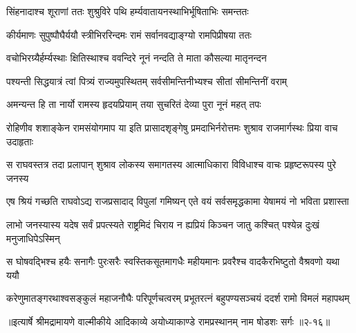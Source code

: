 \twolineshloka
{सिंहनादाश्च शूराणां ततः शुश्रुविरे पथि}
{हर्म्यवातायनस्थाभिर्भूषिताभिः समन्ततः} %

\twolineshloka
{कीर्यमाणः सुपुष्पौघैर्ययौ स्त्रीभिररिन्दमः}
{रामं सर्वानवद्याङ्ग्यो रामपिप्रीषया ततः} %

\twolineshloka
{वचोभिरग्र्यैर्हर्म्यस्थाः क्षितिस्थाश्च ववन्दिरे}
{नूनं नन्दति ते माता कौसल्या मातृनन्दन} %

\twolineshloka
{पश्यन्ती सिद्धयात्रं त्वां पित्र्यं राज्यमुपस्थितम्}
{सर्वसीमन्तिनीभ्यश्च सीतां सीमन्तिनीं वराम्} %

\twolineshloka
{अमन्यन्त हि ता नार्यो रामस्य हृदयप्रियाम्}
{तया सुचरितं देव्या पुरा नूनं महत् तपः} %

\threelineshloka
{रोहिणीव शशाङ्केन रामसंयोगमाप या}
{इति प्रासादशृङ्गेषु प्रमदाभिर्नरोत्तमः}
{शुश्राव राजमार्गस्थः प्रिया वाच उदाहृताः} %

\twolineshloka
{स राघवस्तत्र तदा प्रलापान् शुश्राव लोकस्य समागतस्य}
{आत्माधिकारा विविधाश्च वाचः प्रहृष्टरूपस्य पुरे जनस्य} %

\twolineshloka
{एष श्रियं गच्छति राघवोऽद्य राजप्रसादाद् विपुलां गमिष्यन्}
{एते वयं सर्वसमृद्धकामा येषामयं नो भविता प्रशास्ता} %

\twolineshloka
{लाभो जनस्यास्य यदेष सर्वं प्रपत्स्यते राष्ट्रमिदं चिराय}
{न ह्यप्रियं किञ्चन जातु कश्चित् पश्येन्न दुःखं मनुजाधिपेऽस्मिन्} %

\twolineshloka
{स घोषवद्भिश्च हयैः सनागैः पुरःसरैः स्वस्तिकसूतमागधैः}
{महीयमानः प्रवरैश्च वादकैरभिष्टुतो वैश्रवणो यथा ययौ} %

\twolineshloka
{करेणुमातङ्गरथाश्वसङ्कुलं महाजनौघैः परिपूर्णचत्वरम्}
{प्रभूतरत्नं बहुपण्यसञ्चयं ददर्श रामो विमलं महापथम्} %


॥इत्यार्षे श्रीमद्रामायणे वाल्मीकीये आदिकाव्ये अयोध्याकाण्डे रामप्रस्थानम् नाम षोडशः सर्गः ॥२-१६॥

